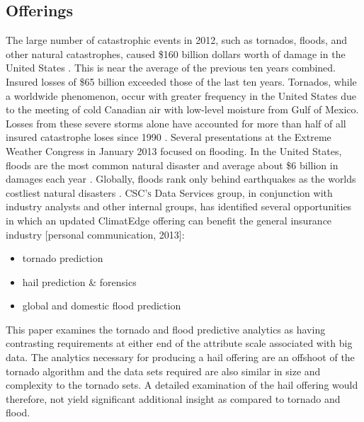 \subsection{Offerings}
The large number of catastrophic events in 2012, such as tornados, floods, and other natural catastrophes, caused \$160  billion dollars worth of damage in the United States \cite{stalder}. This is near the average of the previous ten years combined. Insured losses of \$65 billion exceeded those of the last ten years. Tornados, while a worldwide phenomenon, occur with greater frequency in the United States due to the meeting of cold Canadian air with low-level moisture from Gulf of Mexico. Losses from these severe storms alone have accounted for more than half of all insured catastrophe loses since 1990 \cite{lloyds}. Several presentations at the Extreme Weather Congress in January 2013 focused on flooding. In the United States, floods are the most common natural disaster and average about \$6 billion in damages each year \cite{hope}. Globally, floods rank only behind earthquakes as the worlds costliest natural disasters \cite{li}. \textsc{CSC's} Data Services group, in conjunction with industry analysts and other internal groups, has identified several opportunities in which an updated ClimatEdge offering can benefit the general insurance industry [personal communication, 2013]:
\begin{itemize}
    \item tornado prediction
    \item hail prediction \& forensics
    \item global and domestic flood prediction
\end{itemize}
This paper examines the tornado and flood predictive analytics as having contrasting requirements at either end of the attribute scale associated with big data. The analytics necessary for producing a hail offering are an offshoot of the tornado algorithm and the data sets required are also similar in size and complexity to the tornado sets. A detailed examination of the hail offering would therefore, not yield significant additional insight as compared to tornado and flood.